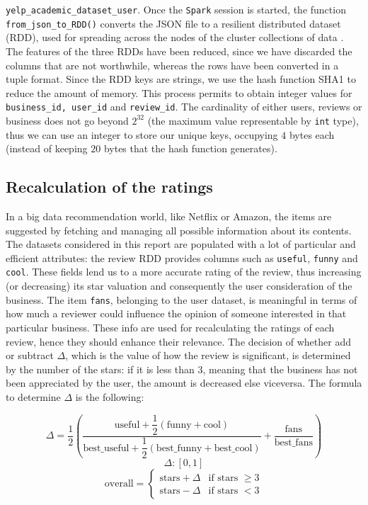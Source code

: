 \documentclass{article}
\begin{document}
\texttt{yelp\_academic\_dataset\_user}. Once the \texttt{Spark} session is started, the function \texttt{from\_json\_to\_RDD()} converts the JSON file to a resilient distributed dataset (RDD), used for spreading across the nodes of the cluster collections of data \cite{rdd}.
The features of the three RDDs have been reduced, since we have discarded the columns that are not worthwhile, whereas the rows have been converted in a tuple format. 
Since the RDD keys are strings, we use the hash function SHA1 to reduce the amount of memory. This process permits to obtain integer values for \texttt{business\_id, user\_id} and \texttt{review\_id}. The cardinality of either users, reviews or business does not go beyond $2^{32}$ (the maximum value representable by \texttt{int} type), thus we can use an integer to store our unique keys, occupying $4$ bytes each (instead of keeping $20$ bytes that the hash function generates). 

\subsection{Recalculation of the ratings}
In a big data recommendation world, like Netflix or Amazon, the items are suggested by fetching and managing all possible information about its contents. The datasets considered in this report are populated with a lot of particular and efficient attributes: the review RDD provides columns such as \texttt{useful}, \texttt{funny} and \texttt{cool}. These fields lend us to a more accurate rating of the review, thus increasing (or decreasing) its star valuation and consequently the user consideration of the business. The item \texttt{fans}, belonging to the user dataset, is meaningful in terms of how much a reviewer could influence the opinion of someone interested in that particular business. These info are used for recalculating the ratings of each review, hence they should enhance their relevance. The decision of whether add or subtract $\Delta$, which is the value of how the review is significant, is determined by the number of the stars: if it is less than $3$, meaning that the business has not been appreciated by the user, the amount is decreased else viceversa.  The formula to determine $\Delta$ is the following:

$$
  \Delta = \dfrac{1}{2} 
              \left( 
                  \dfrac{\text{useful} + \dfrac{1}{2}(\text{funny} + \text{cool})} 
                        {\text{best\_useful} + \dfrac{1}{2}(\text{best\_funny} + \text{best\_cool})}
                        + 
                  \dfrac{\text{fans}}
                        {\text{best\_fans}}
              \right)
$$
$$
\Delta : [0, 1]
$$
$$
  \text{overall} = \begin{cases} 
              \text{stars} + \Delta & \text{if stars } \ge 3\\
              \text{stars} - \Delta & \text{if stars } < 3
            \end{cases}
$$
\end{document}
